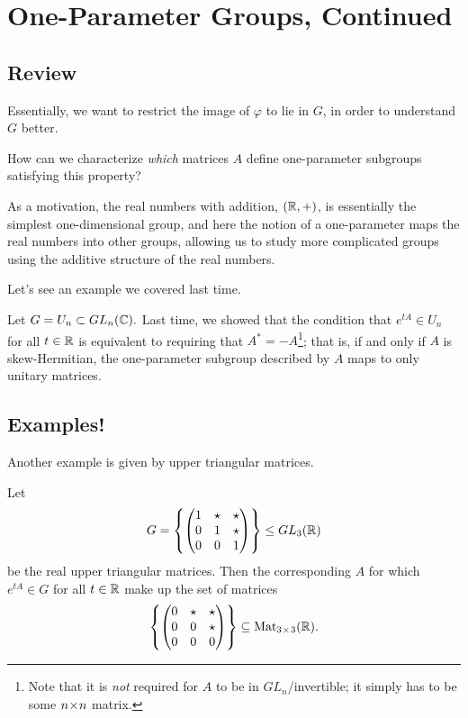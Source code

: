 
\section{One-Parameter Groups, Continued}

\subsection{Review}
Essentially, we want to restrict the image of $\varphi$ to lie in $G$, in order to understand $G$ better.

\begin{qq}
How can we characterize \emph{which} matrices $A$ define one-parameter subgroups satisfying this property?
\end{qq}

As a motivation, the real numbers with addition, $(\mathbb R, +)$, is essentially the simplest one-dimensional group, and here the notion of a one-parameter maps the real numbers into other groups, allowing us to study more complicated groups using the additive structure of the real numbers.

Let's see an example we covered last time.
\begin{example}
Let $G = U_n \subset GL_n(\mathbb C).$ Last time, we showed that the condition that $e^{tA} \in U_n$ for all $t \in \mathbb R$ is equivalent to requiring that $A^* = -A$\footnote{Note that it is \emph{not} required for $A$ to be in $GL_n$/invertible; it simply has to be some $n \hspace{0.05em}{\times}\hspace{0.05em} n$ matrix.}; that is, if and only if $A$ is skew-Hermitian, the one-parameter subgroup described by $A$ maps to only unitary matrices. %
\end{example}

\subsection{Examples!}

Another example is given by upper triangular matrices.
\begin{example}%
Let
\[
G = \left\{ \begin{pmatrix} 1 & \star & \star \\ 0 & 1 & \star \\ 0 & 0 & 1 \end{pmatrix}\right\} \leq GL_3(\mathbb R)
\]
be the real upper triangular matrices. Then the corresponding $A$ for which $e^{tA}  \in G$ for all $t \in \mathbb R$ make up the set of matrices \[\left\{\begin{pmatrix} 0 & \star & \star \\ 0 & 0 & \star \\ 0 & 0 & 0 \end{pmatrix}\right\} \subseteq \text{Mat}_{3 \hspace{0.05em}{\times}\hspace{0.05em} 3}(\mathbb R).\]

\end{example}

